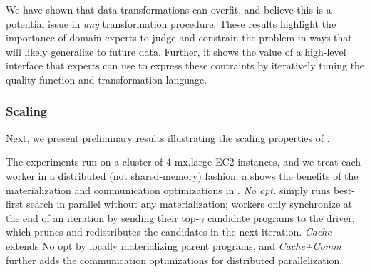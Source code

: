  We have shown that data transformations can overfit, and believe this is a potential issue in {\it any} transformation procedure. These results highlight the importance of domain experts to judge and constrain the problem in ways that will likely generalize to future data. Further, it shows the value of a high-level interface that experts can use to express these contraints by iteratively tuning the quality function and transformation language. 



\subsubsection{Scaling}
Next, we present preliminary results illustrating the scaling properties of \sys. 

\vspace{1em}

 The experiments run on a cluster of 4 mx.large EC2 instances, and we treat each worker in a distributed (not shared-memory) fashion.   a shows the benefits of the materialization and communication optimizations in .  {\it No opt.} simply runs best-first search in parallel without any materialization; workers only synchronize at the end of an iteration by sending their top-$\gamma$ candidate programs to the driver, which prunes and redistributes the candidates in the next iteration.  {\it Cache} extends No opt by locally materializing parent programs, and {\it Cache+Comm} further adds the communication optimizations for distributed parallelization.   

